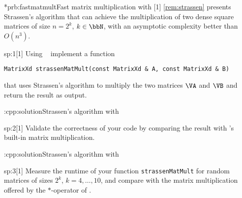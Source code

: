 \begin{samproblem}*{prb:fastmatmult}{Fast matrix multiplication with \eigen{}}[1]{
\cref{rem:strassen} presents Strassen's algorithm that can achieve
  the multiplication of two dense square matrices of size {$n=2^{k}$},
  $k\in\bbN$, with an asymptotic complexity better than $O(n^{3})$.
}

\begin{subproblem}{sp:1}[1]
	Using \eigen~ implement a function
	\begin{lstlisting}[style=cppsimple]
	 MatrixXd strassenMatMult(const MatrixXd & A, const MatrixXd & B)
	\end{lstlisting}
	that uses Strassen's algorithm to multiply the two matrices $\VA$ and
	$\VB$ and return the result as output. 

  \begin{samsolution}
    \begin{samcode}[C++-code]{\cpl:cpp:solution}{Strassen's algorithm with \eigen{}}
    \end{samcode}
  \end{samsolution}

\end{subproblem}

\begin{subproblem}{sp:2}[1]
	Validate the correctness of your code by comparing the result
    with \eigen's built-in matrix multiplication.

  \begin{samsolution}
    \begin{samcode}[C++-code]{\cpl:cpp:solution}{Strassen's algorithm with \eigen{}}
    \end{samcode}
  \end{samsolution}
\end{subproblem}

\begin{subproblem}{sp:3}[1]
	Measure the runtime of your function
    \lstinline[style=cppsimple]|strassenMatMult|
    for random matrices of sizes $2^{k}$, $k=4,\ldots,10$, and compare
    with the matrix multiplication offered by the $\ast$-operator
    of \eigen{}.


\end{subproblem}
\end{samproblem}
